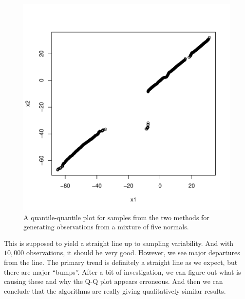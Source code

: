 \begin{figure}[htbp]
\begin{center}
\leavevmode
\includegraphics{RNG/images/algorithmBasicQQplot.pdf}
\caption{A quantile-quantile plot for samples from the two methods for
  generating observations from a mixture of five normals.}
\label{fig:mix5NormDensity}
\end{center}
\end{figure}

This is supposed to yield a straight line up to sampling variability.
And with $10,000$ observations, it should be very good.  However, we
see major departures from the line.  The primary trend is definitely a
straight line as we expect, but there are major ``bumps''.  After a
bit of investigation, we can figure out what is causing these and why
the Q-Q plot appears erroneous. And then we can conclude that the
algorithms are really giving qualitatively similar results.

